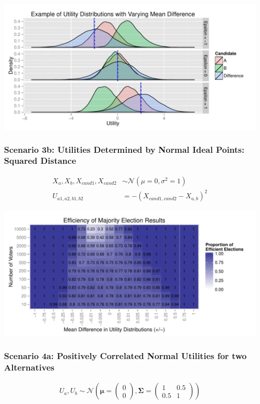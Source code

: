 \documentclass[12pt]{article}\usepackage[]{graphicx}\usepackage[]{color}
\makeatletter
\def\maxwidth{ %
  \ifdim\Gin@nat@width>\linewidth
    \linewidth
  \else
    \Gin@nat@width
  \fi
}
\newenvironment{knitrout}{}{} %
\makeatother
\begin{document}
\begin{knitrout}
\color{fgcolor}
\includegraphics[width=\maxwidth]{figure/unnamed-chunk-6} 

\end{knitrout}


\clearpage
\subsubsection*{Scenario 3b: Utilities Determined by Normal Ideal Points: Squared Distance}
\begin{align*}
X_a,X_b,X_{cand1},X_{cand2} &\sim \mathcal{N}(\mu=0,\sigma^2=1) \\
U_{a1,a2,b1,b2} &= -(X_{cand1,cand2}-X_{a,b})^2
\end{align*}

\begin{knitrout}
\color{fgcolor}
\includegraphics[width=\maxwidth]{figure/unnamed-chunk-7} 

\end{knitrout}


\clearpage
\subsubsection*{Scenario 4a: Positively Correlated Normal Utilities for two Alternatives}
\begin{align*}
U_a,U_b \sim \mathcal{N}\left(
\boldsymbol{\mu}=\begin{pmatrix}0 \\ 0\end{pmatrix},
\mathbf{\Sigma}=\begin{pmatrix}1 & 0.5 \\ 0.5 & 1\end{pmatrix}\right)
\end{align*}
\end{document}
